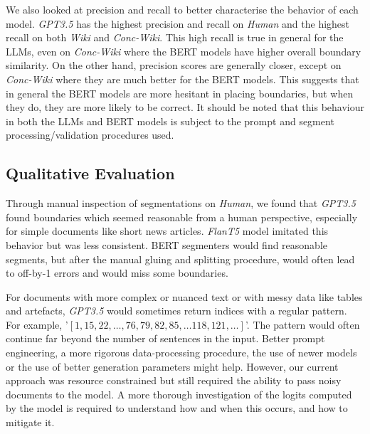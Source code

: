 We also looked at precision and recall to better characterise the behavior of each model. \emph{GPT3.5} has the highest precision and recall on \emph{Human} and the highest recall on both \emph{Wiki} and \emph{Conc-Wiki}. This high recall is true in general for the LLMs, even on \emph{Conc-Wiki} where the BERT models have higher overall boundary similarity. On the other hand, precision scores are generally closer, except on \emph{Conc-Wiki} where they are much better for the BERT models. This suggests that in general the BERT models are more hesitant in placing boundaries, but when they do, they are more likely to be correct. It should be noted that this behaviour in both the LLMs and BERT models is subject to the prompt and segment processing/validation procedures used.

\subsection{Qualitative Evaluation}

Through manual inspection of segmentations on \emph{Human}, we found that \emph{GPT3.5} found boundaries which seemed reasonable from a human perspective, especially for simple documents like short news articles. \emph{FlanT5} model imitated this behavior but was less consistent. BERT segmenters would find reasonable segments, but after the manual gluing and splitting procedure, would often lead to off-by-1 errors and would miss some boundaries.

For documents with more complex or nuanced text or with messy data like tables and artefacts, \emph{GPT3.5} would sometimes return indices with a regular pattern. For example, '$[1,15,22, \ldots, 76, 79, 82, 85, \ldots 118, 121, \ldots]$'. The pattern would often continue far beyond the number of sentences in the input. Better prompt engineering, a more rigorous data-processing procedure, the use of newer models or the use of better generation parameters might help. However, our current approach was resource constrained but still required the ability to pass noisy documents to the model. A more thorough investigation of the logits computed by the model is required to understand how and when this occurs, and how to mitigate it. 
